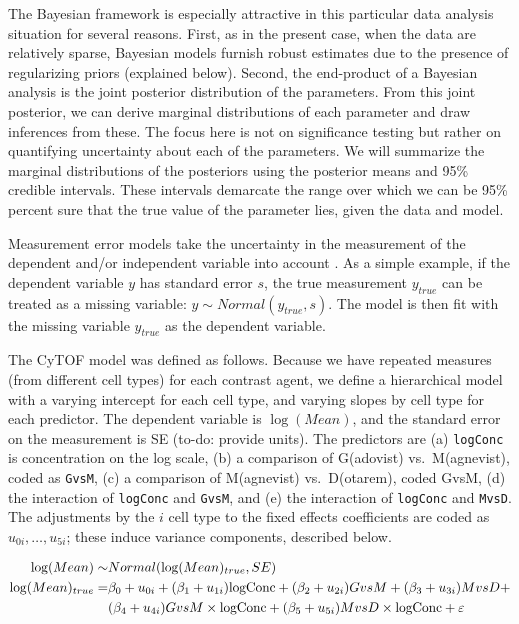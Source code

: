 \documentclass[12pt]{article}
\begin{document}
The Bayesian framework is especially attractive in this particular data analysis situation for several reasons. First, as in the present case, when the data are relatively sparse, Bayesian models furnish robust estimates due to the presence of regularizing priors (explained below). Second, the end-product of a Bayesian analysis is the joint posterior distribution of the parameters. From this joint posterior, we can derive marginal distributions of each parameter and draw inferences from these. The focus here is not on significance testing but rather on quantifying uncertainty about each of the parameters. We will summarize the marginal distributions of the posteriors using the posterior means and 95\% credible intervals. These intervals demarcate the range over which we can be 95\% percent sure that the true value of the parameter lies, given the data and model.

Measurement error models take the uncertainty in the measurement of the dependent and/or independent variable into account \cite{clayton1992models,richardson1993bayesian}. As a simple example, if the dependent variable $y$ has standard error $s$, the true measurement $y_{true}$ can be treated as a missing variable: $y\sim Normal(y_{true}, s)$. The model is then fit with the missing variable $y_{true}$ as the dependent variable. 

The CyTOF model was defined as follows. Because we have repeated measures (from different cell types) for each contrast agent, we define a hierarchical model with a varying intercept for each cell type, and varying slopes by cell type for each predictor. 
The dependent variable is $\log(Mean)$, and the standard error on the measurement is SE (to-do: provide units). The predictors are (a) \texttt{logConc} is concentration on the log scale, (b)  a comparison of G(adovist) vs.\  M(agnevist), coded as \texttt{GvsM}, (c)  a comparison of M(agnevist) vs.\ D(otarem), coded GvsM, (d)  the interaction of   \texttt{logConc} and \texttt{GvsM}, and (e) the interaction of   \texttt{logConc} and \texttt{MvsD}. The adjustments by the $i$ cell type to the fixed effects coefficients are coded as $u_{0i},\dots, u_{5i}$; these induce variance components, described below.

\begin{equation}
\begin{split}
\log(Mean) \sim& Normal(\log(Mean)_{true}, SE)\\
\log(Mean)_{true} =& \beta_0 + u_{0i} + (\beta_1 + u_{1i})\hbox{logConc} + (\beta_2 + u_{2i}) GvsM +
(\beta_3 + u_{3i}) MvsD +\\
~& (\beta_4 + u_{4i}) GvsM\times  \hbox{logConc} + (\beta_5 + u_{5i})MvsD\times  \hbox{logConc} + \varepsilon\\
\end{split}
\end{equation}
\end{document}
